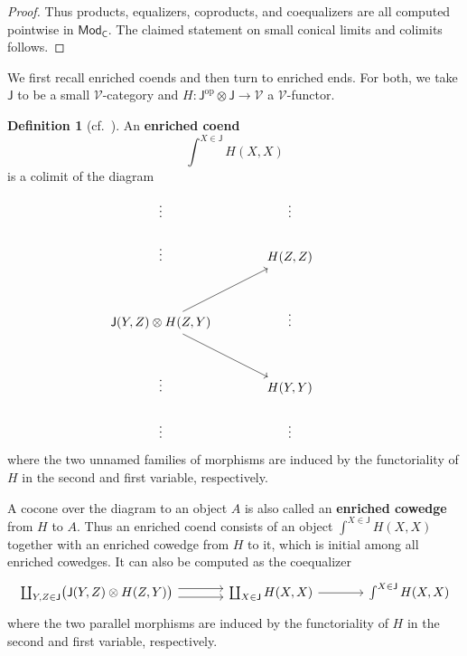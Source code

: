 \documentclass[11pt,onecolumn]{article}
\newcommand{\cV}{\mathscr{V}}
\newcommand{\cC}{\mathsf{C}}
\newcommand{\cJ}{\mathsf{J}}
\newcommand{\op}{\mathrm{op}}
\newcommand{\Mod}{\mathsf{Mod}}
\theoremstyle{plain}
\theoremstyle{remark}
\theoremstyle{definition}
\newtheorem{definition}[definition]{Definition}
\begin{document}
\begin{proof}
	Thus products, equalizers, coproducts, and coequalizers are all computed pointwise in $\Mod_\cC$.
	The claimed statement on small conical limits and colimits follows.
\end{proof}

We first recall enriched coends and then turn to enriched ends.
For both, we take $\cJ$ to be a small $\cV$-category and $H \colon \cJ^\op \otimes \cJ \longrightarrow \cV$ a $\cV$-functor.

\begin{definition}[{cf.~\cite[\S 2.1]{Kelly}}]
	\label{def:enriched_coend}
	An \textbf{enriched coend} 
	\[
		\int^{X \in \cJ} H(X,X)
	\]
	is a colimit of the diagram
	\begin{equation}
		\label{cowedge_condition}
		\begin{tikzcd}[column sep=large, row sep=large]
			\vdots & \vdots \\[-1.5em]
			\vdots &
			H(Z,Z)
			&
			\\
			\cJ(Y,Z) \otimes H(Z,Y)
				\ar[ur]
				\ar[dr]
			& \vdots
			\\
			\vdots &
			H(Y,Y)
			&
			\\[-1.5em]
			\vdots & \vdots
		\end{tikzcd}
	\end{equation}
	where the two unnamed families of morphisms are induced by the functoriality of $H$ in the second and first variable, respectively.
\end{definition}

A cocone over the diagram to an object $A$ is also called an \textbf{enriched cowedge} from $H$ to $A$.
Thus an enriched coend consists of an object $\int^{X \in \cJ} H(X,X)$ together with an enriched cowedge from $H$ to it, which is initial among all enriched cowedges.
It can also be computed as the coequalizer
\[
	\begin{tikzcd}[column sep=large]
		\coprod_{Y,Z \in \cJ} \bigl( \cJ(Y,Z) \otimes H(Z,Y)\bigr)
		\ar[r, shift left=.8ex]
		\ar[r, shift right=.8ex]
		&
		\coprod_{X \in \cJ} H(X,X)
		\ar[r]
		&
		\int^{X \in \cJ} H(X,X)
	\end{tikzcd}
\]
where the two parallel morphisms are induced by the functoriality of $H$ in the second and first variable, respectively.
\end{document}
